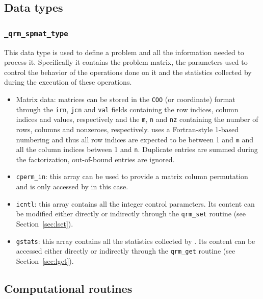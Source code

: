 \documentclass[11pt]{article}
\begin{document}

\subsection{Data types}
\subsubsection{\texttt{\_qrm\_spmat\_type}}
This data type is used to define a problem and all the information
needed to process it. Specifically it contains the problem matrix, the
parameters used to control the behavior of the \qrm operations done on
it and the statistics collected by \qrm during the execution of these
operations.


\begin{itemize}
\item Matrix data: matrices can be stored in the \texttt{COO} (or
  coordinate) format through the \texttt{irn}, \texttt{jcn} and
  \texttt{val} fields containing the row indices, column indices and
  values, respectively and the \texttt{m}, \texttt{n} and \texttt{nz}
  containing the number of rows, columns and nonzeroes,
  respectively. \qrm uses a Fortran-style 1-based numbering and thus
  all row indices are expected to be between 1 and \texttt{m} and all
  the column indices between 1 and \texttt{n}. Duplicate entries are
  summed during the factorization, out-of-bound entries are ignored.
\item \texttt{cperm\_in}: this array can be used to provide a matrix
  column permutation and is only accessed by \qrm in this case.
\item \texttt{icntl}: this array contains all the integer control
  parameters. Its content can be modified either directly or
  indirectly through the \texttt{qrm\_set} routine (see
  Section~\ref{sec:lset}).
\item \texttt{gstats}: this array contains all the statistics
  collected by \qrm. Its content can be accessed either directly or
  indirectly through the \texttt{qrm\_get} routine (see
  Section~\ref{sec:lget}).
\end{itemize}



\subsection{Computational routines}
\end{document}
